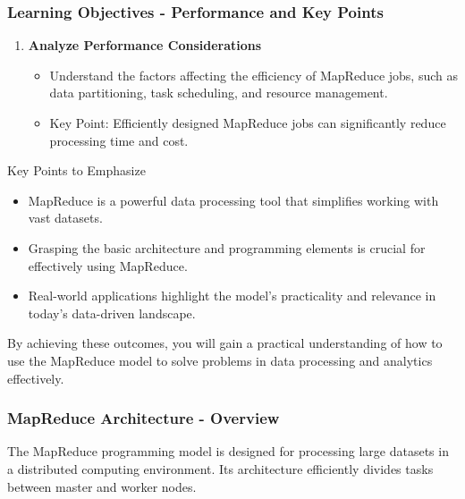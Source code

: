 \documentclass[aspectratio=169]{beamer}
\begin{document}
\begin{frame}[fragile]
    \frametitle{Learning Objectives - Performance and Key Points}
    \begin{enumerate}
        \item \textbf{Analyze Performance Considerations}
        \begin{itemize}
            \item Understand the factors affecting the efficiency of MapReduce jobs, such as data partitioning, task scheduling, and resource management.
            \item Key Point: Efficiently designed MapReduce jobs can significantly reduce processing time and cost.
        \end{itemize}
    \end{enumerate}    
    
    \begin{block}{Key Points to Emphasize}
        \begin{itemize}
            \item MapReduce is a powerful data processing tool that simplifies working with vast datasets.
            \item Grasping the basic architecture and programming elements is crucial for effectively using MapReduce.
            \item Real-world applications highlight the model's practicality and relevance in today's data-driven landscape.
        \end{itemize}
    \end{block}

    By achieving these outcomes, you will gain a practical understanding of how to use the MapReduce model to solve problems in data processing and analytics effectively.
\end{frame}

\begin{frame}[fragile]
    \frametitle{MapReduce Architecture - Overview}
    The MapReduce programming model is designed for processing large datasets in a distributed computing environment. Its architecture efficiently divides tasks between master and worker nodes.
\end{frame}
\end{document}
